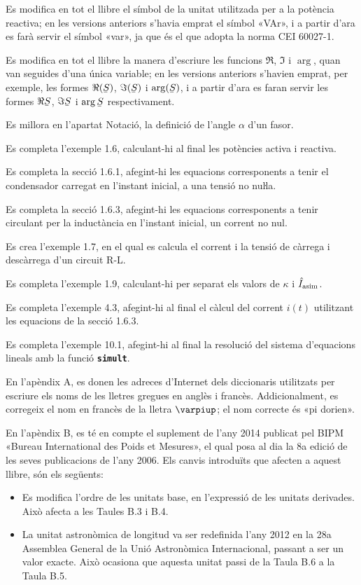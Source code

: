 Es modifica en tot el llibre el símbol de la unitat  utilitzada per a la potència reactiva; en les versions anteriors s'havia emprat el símbol «VAr», i a partir d'ara es farà servir el símbol «var», ja que és el que adopta la norma CEI 60027-1.

Es modifica en tot el llibre la manera d'escriure les funcions $\Re$, $\Im$ i $\arg$, quan van seguides d'una única variable; en les versions anteriors s'havien emprat, per exemple, les formes $\Re(\cmplx{S})$, $\Im(\cmplx{S})$ i $\arg(\cmplx{S})$, i a partir d'ara es faran servir les formes $\Re\cmplx{S}$, $\Im\cmplx{S}$ i $\arg\cmplx{S}$ respectivament.


Es millora en l’apartat Notació, la definició de l’angle $\alpha$ d’un fasor.


Es completa l'exemple 1.6, calculant-hi al final les potències activa i reactiva.

Es completa la secció 1.6.1, afegint-hi les equacions corresponents a tenir el condensador carregat en l'instant inicial, a una tensió no nuŀla.

Es completa la secció 1.6.3, afegint-hi les equacions corresponents a tenir circulant per la inductància en l'instant  inicial, un corrent no nul.

Es crea l'exemple 1.7, en el qual es calcula el corrent i la tensió de càrrega i descàrrega d'un circuit R-L.

Es completa l'exemple 1.9, calculant-hi per separat els valors de $\kappa$ i $\hat{I}_\mathrm{asim}$.


Es completa l'exemple 4.3, afegint-hi al final el càlcul del corrent $i(t)$ utilitzant les equacions de la secció 1.6.3.

Es completa l'exemple 10.1, afegint-hi al final la resolució del sistema d'equacions lineals amb la funció \texttt{\textbf{simult}}.


En l'apèndix A, es donen les adreces d'Internet dels diccionaris utilitzats per escriure els noms de les lletres gregues en anglès i francès. Addicionalment, es corregeix el nom en francès de la lletra $\varpiup$; el nom correcte és «pi dorien».

En l'apèndix B, es té en compte el suplement de l'any 2014 publicat pel BIPM «Bureau International des Poids et Mesures», el qual posa al dia la 8a edició de les seves publicacions de l'any 2006. Els canvis introduïts que afecten a aquest llibre, són els següents:
\begin{itemize}
  \item Es modifica l'ordre de les unitats base, en l'expressió de les unitats derivades. Això afecta  a les Taules B.3 i B.4.
  \item La unitat astronòmica de longitud va ser redefinida l'any 2012 en la 28a Assemblea General de la Unió Astronòmica Internacional, passant a ser un valor exacte. Això ocasiona que aquesta unitat passi de la Taula B.6  a la Taula  B.5.
\end{itemize}

